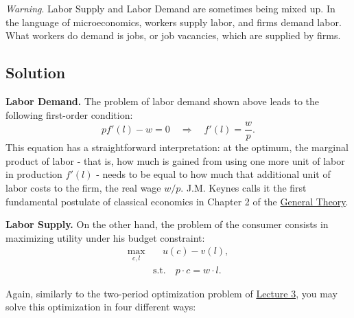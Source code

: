 \documentclass[]{book}
\theoremstyle{definition}
\theoremstyle{definition}
\theoremstyle{definition}
\theoremstyle{remark}
\begin{document}
\emph{Warning}. Labor Supply and Labor Demand are sometimes being mixed
up. In the language of microeconomics, workers supply labor, and firms
demand labor. What workers do demand is jobs, or job vacancies, which
are supplied by firms.

\subsection{Solution}\label{solution-3}

\textbf{Labor Demand.} The problem of labor demand shown above leads to
the following first-order condition:
\[pf'(l)-w = 0 \quad \Rightarrow \quad f'(l)=\frac{w}{p}.\] This
equation has a straightforward interpretation: at the optimum, the
marginal product of labor - that is, how much is gained from using one
more unit of labor in production \(f'(l)\) - needs to be equal to how
much that additional unit of labor costs to the firm, the real wage
\(w/p\). J.M. Keynes calls it the first fundamental postulate of
classical economics in Chapter 2 of the
\href{http://cas2.umkc.edu/economics/people/facultypages/kregel/courses/econ645/winter2011/generaltheory.pdf}{General
Theory}.

\textbf{Labor Supply.} On the other hand, the problem of the consumer
consists in maximizing utility under his budget constraint: \[
\begin{aligned}
\max_{c,l}& \quad u(c)-v(l),\\
&\text{s.t.}\quad p \cdot c = w \cdot l.
\end{aligned}
\]

Again, similarly to the two-period optimization problem of
\href{lecture3.html}{Lecture 3}, you may solve this optimization in four
different ways:
\end{document}

